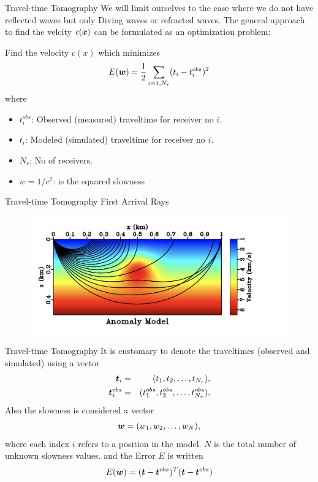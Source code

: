 \documentclass[xcolor=dvipsnames,notes]{beamer}
\begin{document}
%
\begin{frame}{Travel-time Tomography}
We will limit ourselves to the case where we do not have reflected
waves but only Diving waves or refracted waves. 
The general approach to find the velcity $c(\mbox{\boldmath $x$})$ can be formulated as
an optimization problem:

Find the velocity $c(x)$ which minimizes 
\begin{eqnarray}
E(\mbox{\boldmath $w$})=\frac{1}{2}\sum_{i=1,N_r}(t_i - t^{obs}_i)^2
\end{eqnarray}
where 
\begin{itemize}
  \item $t^{obs}_i$: Observed (measured) traveltime for receiver no $i$.
  \item $t_i$:   Modeled (simulated) traveltime for receiver no $i$.
  \item $N_r$: No of receivers.
  \item $w=1/c^2$: is the squared slowness 
\end{itemize}
\end{frame}
%
\begin{frame}{Travel-time Tomography}
First Arrival Rays
\begin{figure}
  \includegraphics[width=\textwidth]{Fig/fig1.png}
\end{figure}
\end{frame}
\begin{frame}{Travel-time Tomography}
It is customary to denote the traveltimes (observed and simulated)
using a vector
\begin{eqnarray}
  \mbox{\boldmath $t$}_i & = & (t_1,t_2,\ldots,t_{N_r}),\\
  \mbox{\boldmath $t$}^{obs}_i & = & (t^{obs}_1, t^{obs}_2,\ldots,t^{obs}_{N_r}),
\end{eqnarray}
Also the slowness is considered a vector
\begin{eqnarray}
  \mbox{\boldmath $w$} = (w_1,w_2,\ldots,w_{N}),
\end{eqnarray}
where each index $i$ refers to a position in the model. $N$ is the
total number of unknown slowness values.
and the Error $E$ is written
\begin{eqnarray}
  E(\mbox{\boldmath $w$}) = (\mbox{\boldmath $t$}-\mbox{\boldmath $t$}^{obs})^T(\mbox{\boldmath $t$}-\mbox{\boldmath $t$}^{obs}) 
\end{eqnarray}
\end{frame}
\end{document}
